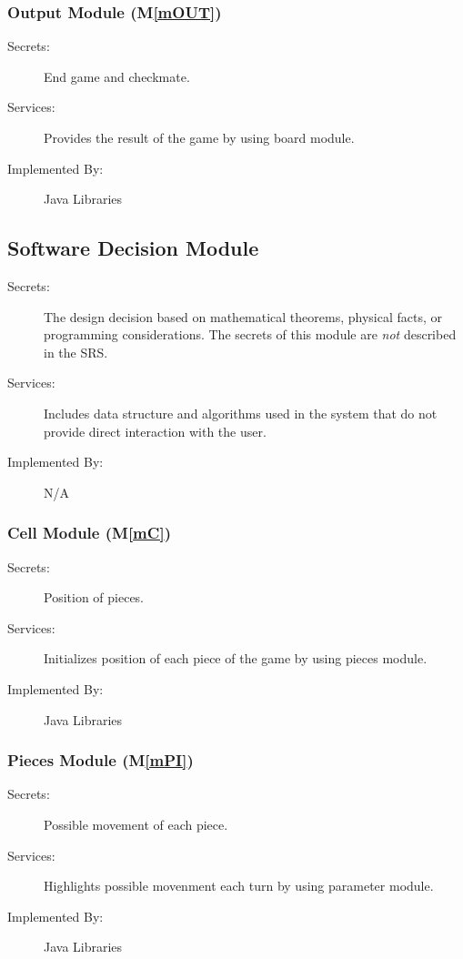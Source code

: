 \documentclass[12pt, titlepage]{article}
\newcommand{\mref}[1]{M\ref{#1}}
\begin{document}
\subsubsection{Output Module (\mref{mOUT})}
\begin{description}
\item[Secrets:] End game and checkmate.
\item[Services:]Provides the result of the game by using board module.
\item[Implemented By:] Java Libraries
\end{description}



\subsection{Software Decision Module}

\begin{description}
\item[Secrets:] The design decision based on mathematical theorems, physical
  facts, or programming considerations. The secrets of this module are
  \emph{not} described in the SRS.
\item[Services:] Includes data structure and algorithms used in the system that
  do not provide direct interaction with the user. 
\item[Implemented By:] N/A
\end{description}

\subsubsection{Cell Module (\mref{mC})}

\begin{description}
\item[Secrets:] Position of pieces.
\item[Services:]Initializes position of each piece of the game by using pieces module.
\item[Implemented By:] Java Libraries
\end{description}

\subsubsection{Pieces Module (\mref{mPI})}

\begin{description}
\item[Secrets:] Possible movement of each piece.
\item[Services:] Highlights possible movenment each turn by using parameter module.
\item[Implemented By:] Java Libraries
\end{description}
\end{document}
